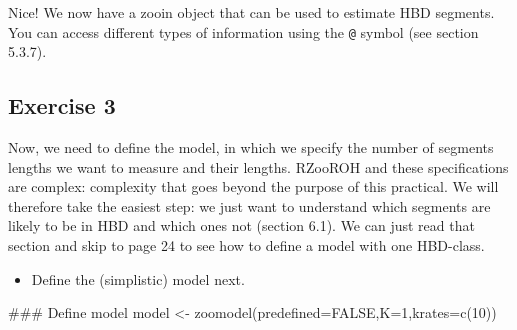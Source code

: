 \documentclass[
  letterpaper,
  DIV=11,
  numbers=noendperiod]{scrreprt}
\newenvironment{Shaded}{}{}
\newcommand{\AttributeTok}[1]{\textcolor[rgb]{0.84,0.23,0.29}{#1}}
\newcommand{\ConstantTok}[1]{\textcolor[rgb]{0.00,0.36,0.77}{#1}}
\newcommand{\DecValTok}[1]{\textcolor[rgb]{0.00,0.36,0.77}{#1}}
\newcommand{\DocumentationTok}[1]{\textcolor[rgb]{0.42,0.45,0.49}{#1}}
\newcommand{\FunctionTok}[1]{\textcolor[rgb]{0.44,0.26,0.76}{#1}}
\newcommand{\NormalTok}[1]{\textcolor[rgb]{0.14,0.16,0.18}{#1}}
\newcommand{\OtherTok}[1]{\textcolor[rgb]{0.44,0.26,0.76}{#1}}
\providecommand{\tightlist}{%
  \setlength{\itemsep}{0pt}\setlength{\parskip}{0pt}}\usepackage{longtable,booktabs,array}
\begin{document}
Nice! We now have a zooin object that can be used to estimate HBD
segments. You can access different types of information using the
\texttt{@} symbol (see section 5.3.7).

\subsection{Exercise 3}\label{exercise-3-1}

Now, we need to define the model, in which we specify the number of
segments lengths we want to measure and their lengths. RZooROH and these
specifications are complex: complexity that goes beyond the purpose of
this practical. We will therefore take the easiest step: we just want to
understand which segments are likely to be in HBD and which ones not
(section 6.1). We can just read that section and skip to page 24 to see
how to define a model with one HBD-class.

\begin{itemize}
\tightlist
\item
  Define the (simplistic) model next.
\end{itemize}

\begin{tcolorbox}[enhanced jigsaw, arc=.35mm, left=2mm, titlerule=0mm, rightrule=.15mm, colframe=quarto-callout-tip-color-frame, coltitle=black, colback=white, opacityback=0, bottomtitle=1mm, bottomrule=.15mm, colbacktitle=quarto-callout-tip-color!10!white, breakable, title=\textcolor{quarto-callout-tip-color}{\faLightbulb}\hspace{0.5em}{Code and answer}, toptitle=1mm, toprule=.15mm, opacitybacktitle=0.6, leftrule=.75mm]

\begin{Shaded}
\begin{Highlighting}[]
\DocumentationTok{\#\#\# Define model}
\NormalTok{model }\OtherTok{\textless{}{-}} \FunctionTok{zoomodel}\NormalTok{(}\AttributeTok{predefined=}\ConstantTok{FALSE}\NormalTok{,}\AttributeTok{K=}\DecValTok{1}\NormalTok{,}\AttributeTok{krates=}\FunctionTok{c}\NormalTok{(}\DecValTok{10}\NormalTok{))}
\end{Highlighting}
\end{Shaded}

\end{tcolorbox}
\end{document}
